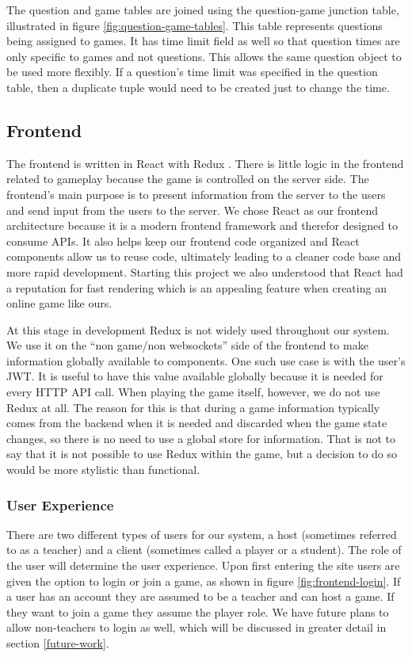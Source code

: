 \documentclass{article}
\begin{document}
    		The question and game tables are joined using the question-game junction table, illustrated in figure \ref{fig:question-game-tables}. This table represents questions being assigned to games. It has time limit field as well so that question times are only specific to games and not questions. This allows the same question object to be used more flexibly. If a question's time limit was specified in the question table, then a duplicate tuple would need to be created just to change the time.

	\subsection{Frontend}
	    The frontend is written in React with Redux \cite{redux}. There is little logic in the frontend related to gameplay because the game is controlled on the server side. The frontend's main purpose is to present information from the server to the users and send input from the users to the server. We chose React as our frontend architecture because it is a modern frontend framework and therefor designed to consume APIs. It also helps keep our frontend code organized and React components allow us to reuse code, ultimately leading to a cleaner code base and more rapid development. Starting this project we also understood that React had a reputation for fast rendering which is an appealing feature when creating an online game like ours.
	    \smallskip
	    
	    At this stage in development Redux is not widely used throughout our system. We use it on the ``non game/non websockets'' side of the frontend to make information globally available to components. One such use case is with the user's JWT. It is useful to have this value available globally because it is needed for every HTTP API call. When playing the game itself, however, we do not use Redux at all. The reason for this is that during a game information typically comes from the backend when it is needed and discarded when the game state changes, so there is no need to use a global store for information. That is not to say that it is not possible to use Redux within the game, but a decision to do so would be more stylistic than functional.
	    
	    \subsubsection{User Experience} \label{ux}
	        There are two different types of users for our system, a host (sometimes referred to as a teacher) and a client (sometimes called a player or a student). The role of the user will determine the user experience. Upon first entering the site users are given the option to login or join a game, as shown in figure \ref{fig:frontend-login}. If a user has an account they are assumed to be a teacher and can host a game. If they want to join a game they assume the player role. We have future plans to allow non-teachers to login as well, which will be discussed in greater detail in section \ref{future-work}.
	        
\end{document}
